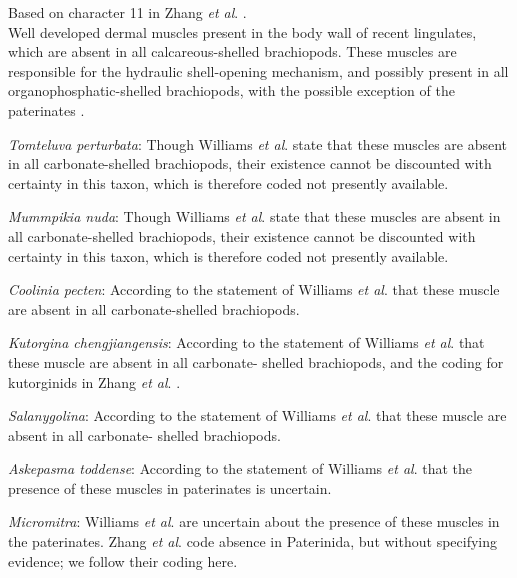 \documentclass[]{book}
\theoremstyle{definition}
\theoremstyle{definition}
\theoremstyle{definition}
\theoremstyle{remark}
\begin{document}
Based on character 11 in Zhang \emph{et al}.
\citeyearpar{Zhang2014Anearly}.\\
Well developed dermal muscles present in the body wall of recent
lingulates, which are absent in all calcareous-shelled brachiopods.
These muscles are responsible for the hydraulic shell-opening mechanism,
and possibly present in all organophosphatic-shelled brachiopods, with
the possible exception of the paterinates
\citep[p.~32]{Williams2000BrachiopodaLinguliformea}.

\emph{Tomteluva perturbata}: Though Williams \emph{et al}.
\citeyearpar[P.32]{Williams2000BrachiopodaLinguliformea} state that
these muscles are absent in all carbonate-shelled brachiopods, their
existence cannot be discounted with certainty in this taxon, which is
therefore coded not presently available.

\emph{Mummpikia nuda}: Though Williams \emph{et al}.
\citeyearpar[P.32]{Williams2000BrachiopodaLinguliformea} state that
these muscles are absent in all carbonate-shelled brachiopods, their
existence cannot be discounted with certainty in this taxon, which is
therefore coded not presently available.

\emph{Coolinia pecten}: According to the statement of Williams \emph{et
al}. \citeyearpar[P.32]{Williams2000BrachiopodaLinguliformea} that these
muscle are absent in all carbonate-shelled brachiopods.

\emph{Kutorgina chengjiangensis}: According to the statement of Williams
\emph{et al}. \citeyearpar[P.32]{Williams2000BrachiopodaLinguliformea}
that these muscle are absent in all carbonate- shelled brachiopods, and
the coding for kutorginids in Zhang \emph{et al}.
\citeyearpar{Zhang2014Anearly}.

\emph{Salanygolina}: According to the statement of Williams \emph{et
al}. \citeyearpar[P.32]{Williams2000BrachiopodaLinguliformea} that these
muscle are absent in all carbonate- shelled brachiopods.

\emph{Askepasma toddense}: According to the statement of Williams
\emph{et al}. \citeyearpar[P.32]{Williams2000BrachiopodaLinguliformea}
that the presence of these muscles in paterinates is uncertain.

\emph{Micromitra}: Williams \emph{et al}.
\citeyearpar[P.32]{Williams2000BrachiopodaLinguliformea} are uncertain
about the presence of these muscles in the paterinates. Zhang \emph{et
al}. \citeyearpar{Zhang2014Anearly} code absence in Paterinida, but
without specifying evidence; we follow their coding here.
\end{document}
